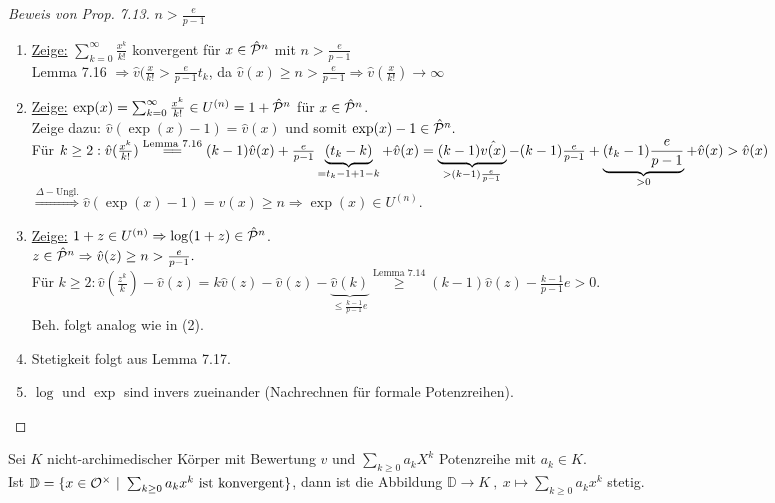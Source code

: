 \begin{proof}[Beweis von Prop. 7.13]
$n>\frac{e}{p-1}$\\
\begin{enumerate}[(1)]
\item \underline{Zeige:} $\sum_{k=0}^\infty \frac{x^k}{k!}$ konvergent für $x \in \hat{\mathcal{P}}^n$ mit $n>\frac{e}{p-1}$\\
Lemma 7.16 $\Rightarrow \hat{v}(\frac{x}{k!}>\frac{e}{p-1}t_k$, da $\hat{v}(x) \geq n > \frac{e}{p-1} \Rightarrow \hat{v}(\frac{x}{k!}) \to \infty$
\item \underline{Zeige:} $\exp(x)=\sum_{k=0}^\infty \frac{x^k}{k!} \in U^{(n)} = 1+\hat{\mathcal{P}}^n$ für $x \in \hat{\mathcal{P}}^n$.\\
Zeige dazu: $\hat{v}(\exp(x)-1)=\hat{v}(x)$ und somit $\exp(x)-1 \in \hat{\mathcal{P}}^n.$\\
Für $k\geq 2: \hat{v}(\frac{x^k}{k!}) \stackrel{\text{Lemma 7.16}}{=\joinrel =} (k-1) \hat{v}(x)+\frac{e}{p-1}\underbrace{(t_k-k)}_{=t_k-1+1-k}+\hat{v}(x)\\
=\underbrace{(k-1)\hat{v(x)}}_{>(k-1)\frac{e}{p-1}}-(k-1)\frac{e}{p-1}+ \underbrace{(t_k-1)\frac{e}{p-1}}_{>0} + \hat{v}(x)>\hat{v}(x)$\\
$\stackrel{\Delta-\text{Ungl.}}{\Rightarrow} \hat{v}(\exp(x)-1)=\hat{v}(x) \geq n \Rightarrow \exp(x) \in U^{(n)}.$
\item \underline{Zeige:} $1+z\in U^{(n)} \Rightarrow \log(1+z)\in \hat{\mathcal{P}}^n$.\\
$z\in \hat{\mathcal{P}}^n \Rightarrow \hat{v}(z) \geq n > \frac{e}{p-1}.$\\
Für $k \geq 2: \hat{v}(\frac{z^k}{k})-\hat{v}(z) = k \hat{v}(z) - \hat{v}(z) - \underbrace{\hat{v}(k)}_{\leq \frac{k-1}{p-1}e} \stackrel{\text{Lemma 7.14}}{\geq} (k-1)\hat{v}(z) - \frac{k-1}{p-1}e >0$.\\
Beh. folgt analog wie in (2).
\item Stetigkeit folgt aus Lemma 7.17.
\item $\log$ und $\exp$ sind invers zueinander (Nachrechnen für formale Potenzreihen).
\end{enumerate}
\end{proof}

\begin{Lem}
Sei $K$ nicht-archimedischer Körper mit Bewertung $v$ und $\sum_{k \geq 0} a_k X^k$ Potenzreihe mit $a_k \in K$.\\
Ist $\mathbb{D}=\{x \in \O^\times \ | \ \sum_{k \geq 0} a_k x^k \text{ ist konvergent} \}$, dann ist die Abbildung $\mathbb{D} \to K \ , \ x \mapsto \sum_{k\geq 0} a_k x^k$ stetig.
\end{Lem}

